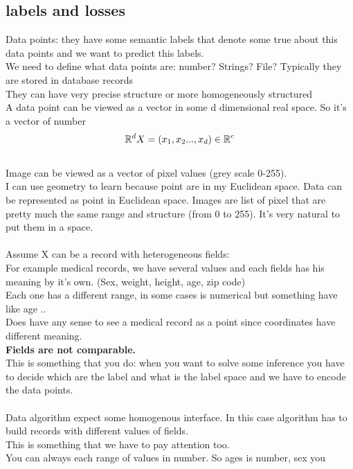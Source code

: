 \documentclass[../main.tex]{subfiles}
\begin{document}
\subsection{labels and losses}
Data points: they have some semantic labels that denote some true about this data points and we want to predict this labels.\\
We need to define what data points are: number? Strings? File? Typically they are stored in database records \\
They can have very precise structure or more homogeneously structured \\
A data point can be viewed as a vector in some d dimensional real space. So it’s a vector of number
\\
$$
\mathbb{R}^d\\\\
X = (x_1,x_2 ..., x_d) \in \mathbb{R}^c
$$
\\
Image can be viewed as a vector of pixel values (grey scale 0-255).\\
I can use geometry to learn because point are in my Euclidean space. Data can be represented as point in Euclidean space. Images are list of pixel that are pretty much the same range and structure (from 0 to 255). It’s very natural to put them in a space.\\\\
Assume X can be a record with heterogeneous fields:\\
For example medical records, we have several values and each fields has his meaning by it’s own. (Sex, weight, height, age, zip code)\\
Each one has a different range, in some cases is numerical but something have like age ..\\
Does have any sense to see a medical record as a point since coordinates
have different meaning.\\
\textbf{Fields are not comparable.}\\
This is something that you do: when you want to solve some inference you have to decide which are the label and what is the label space and we have to encode the data points.\\\\
Data algorithm expect some homogenous interface.
In this case algorithm has to build records with different values of fields.\\
This is something that we have to pay attention too.\\
You can always each range of values in number. So ages is number, sex you
\end{document}
